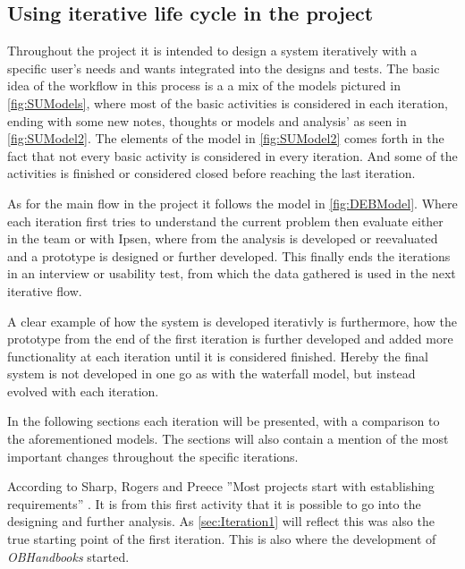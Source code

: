 \subsection{Using iterative life cycle in the project}
Throughout the project it is intended to design a system iteratively with a specific user’s needs and wants integrated into the designs and tests. 
The basic idea of the workflow in this process is a a mix of the models pictured in \cref{fig:SUModels}, where most of the basic activities is considered in each iteration, ending with some new notes, thoughts or models and analysis' as seen in \cref{fig:SUModel2}.
The elements of the model in \cref{fig:SUModel2} comes forth in the fact that not every basic activity is considered in every iteration. And some of the activities is finished or considered closed before reaching the last iteration.

As for the main flow in the project it follows the model in \cref{fig:DEBModel}. Where each iteration first tries to understand the current problem then evaluate either in the team or with Ipsen, where from the analysis is developed or reevaluated and a prototype is designed or further developed.
This finally ends the iterations in an interview or usability test, from which the data gathered is used in the next iterative flow.

A clear example of how the system is developed iterativly is furthermore, how the prototype from the end of the first iteration is further developed and added more functionality at each iteration until it is considered finished.
Hereby the final system is not developed in one go as with the waterfall model,  but instead evolved with each iteration.

In the following sections each iteration will be presented, with a comparison to the aforementioned models.
The sections will also contain a mention of the most important changes throughout the specific iterations. 

According to Sharp, Rogers and Preece ''Most projects start with establishing requirements'' \citep[p.~333]{InteractionDesign}. 
It is from this first activity that it is possible to go into the designing and further analysis.
As \cref{sec:Iteration1} will reflect this was also the true starting point of the first iteration.
This is also where the development of \textit{OBHandbooks} started.
